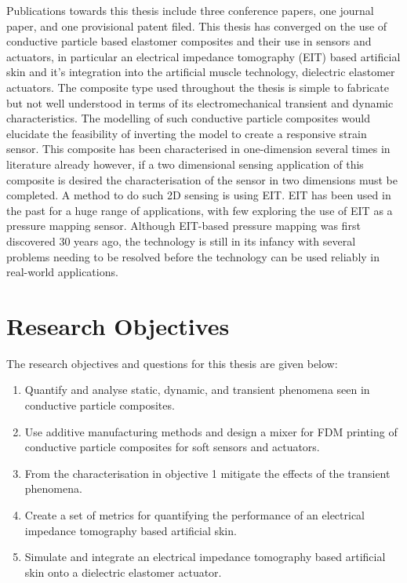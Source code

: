 Publications towards this thesis include three conference papers, one journal paper, and one provisional patent filed. This thesis has converged on the use of conductive particle based elastomer composites and their use in sensors and actuators, in particular an electrical impedance tomography (EIT) based artificial skin and it's integration into the artificial muscle technology, dielectric elastomer actuators. The composite type used throughout the thesis is simple to fabricate but not well understood in terms of its electromechanical transient and dynamic characteristics. The modelling of such conductive particle composites would elucidate the feasibility of inverting the model to create a responsive strain sensor. This composite has been characterised in one-dimension several times in literature already however, if a two dimensional sensing application of this composite is desired the characterisation of the sensor in two dimensions must be completed. A method to do such 2D sensing is using EIT. EIT has been used in the past for a huge range of applications, with few exploring the use of EIT as a pressure mapping sensor. Although EIT-based pressure mapping was first discovered 30 years ago, the technology is still in its infancy with several problems needing to be resolved before the technology can be used reliably in real-world applications.


\section{Research Objectives}
The research objectives and questions for this thesis are given below:
\begin{enumerate}
	\item Quantify and analyse static, dynamic, and transient phenomena seen in conductive particle composites.
	\item Use additive manufacturing methods and design a mixer for FDM printing of conductive particle composites for soft sensors and actuators.
	\item From the characterisation in objective 1 mitigate the effects of the transient phenomena.
	\item Create a set of metrics for quantifying the performance of an electrical impedance tomography based artificial skin.
	\item Simulate and integrate an electrical impedance tomography based artificial skin onto a dielectric elastomer actuator.
\end{enumerate}

